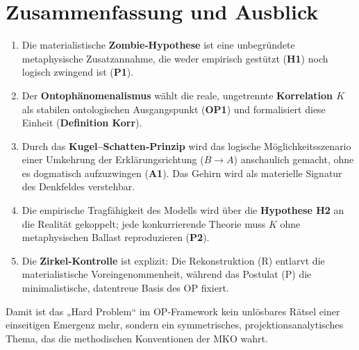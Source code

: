 \documentclass[11pt,a4paper]{article}
\theoremstyle{definition}
\theoremstyle{plain}
\begin{document}
\section{Zusammenfassung und Ausblick}
\begin{enumerate}[label=(\arabic*)]
  \item Die materialistische \textbf{Zombie‑Hypothese} ist eine unbegründete metaphysische Zusatzannahme, die weder empirisch gestützt (\textbf{H1}) noch logisch zwingend ist (\textbf{P1}).  
  \item Der \textbf{Ontophänomenalismus} wählt die reale, ungetrennte \textbf{Korrelation $K$} als stabilen ontologischen Ausgangspunkt (\textbf{OP1}) und formalisiert diese Einheit (\textbf{Definition Korr}).  
  \item Durch das \textbf{Kugel–Schatten‑Prinzip} wird das logische Möglichkeitsszenario einer Umkehrung der Erklärungsrichtung ($B \to A$) anschaulich gemacht, ohne es dogmatisch aufzuzwingen (\textbf{A1}). Das Gehirn wird als materielle Signatur des Denkfeldes verstehbar.
  \item Die empirische Tragfähigkeit des Modells wird über die \textbf{Hypothese H2} an die Realität gekoppelt; jede konkurrierende Theorie muss $K$ ohne metaphysischen Ballast reproduzieren (\textbf{P2}).  
  \item Die \textbf{Zirkel‑Kontrolle} ist explizit: Die Rekonstruktion (R) entlarvt die materialistische Voreingenommenheit, während das Postulat (P) die minimalistische, datentreue Basis des OP fixiert.
\end{enumerate}

Damit ist das „Hard Problem“ im OP‑Framework kein unlösbares Rätsel einer einseitigen Emergenz mehr, sondern ein symmetrisches, projektionsanalytisches Thema, das die methodischen Konventionen der MKO wahrt.
\end{document}
